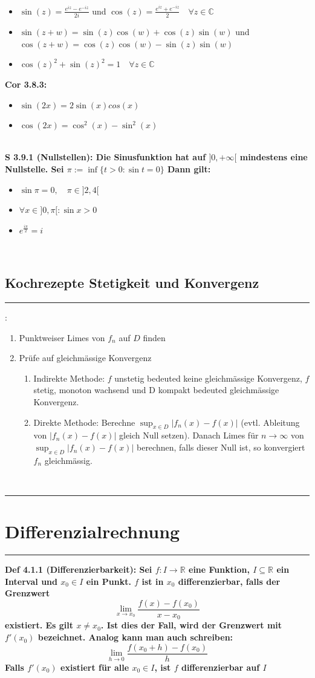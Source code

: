\documentclass[7pt,landscape, margin = 0.1mm]{article}
\newcommand{\titellinie}{\rule{1.\linewidth}{0.75pt}}
\newcommand*{\mysection}[2][black]{\vskip 0pt \titellinie\vspace{-20pt}\section{#2}\vspace{-14pt}\titellinie \colorlet{chaptecolor}{#1}}
\newcommand*{\mysubsection}[1]{\vspace{-2mm}\color{chaptercolor}\subsection{ #1 }
\vspace{-1mm}\hrule\vspace{1.5mm}\color{black}
\vspace{2mm}}
\newcommand{\KRZ}[2]{\vspace{1mm} \hline \vspace{1mm} \color{chaptercolor}{RC #1}:\color{black} \   \hspace{0.2cm}\vspace{1mm}   {\begin{minipage}{20em}
#2 \end{minipage}} \vspace{1mm}  \hline \vspace{1mm}  \\}
\newcommand{\DEF}[2]{\color{chaptercolor}\bf{Def #1}:\color{black}    \hspace{0.2cm} #2 \\}
\newcommand{\COR}[2]{\color{chaptercolor}\bf{Cor #1}:\color{black}    \hspace{0.2cm} #2 \\}
\newcommand{\SA}[2]{\color{chaptercolor}\bf{S #1}:\color{black}    \hspace{0.2cm} #2 \\}
\begin{document}
\begin{multicols}{4}
\begin{flushleft}
{\begin{itemize}
\item[3.] $\sin(z) = \frac{e^{iz}-e^{-i z}}{2i}$ und $\cos(z) = \frac{e^{iz}+e^{-i z}}{2} \quad \forall z \in \mathbb{C}$
\item[4.] $\sin(z+w) = \sin(z)\cos(w)+ \cos(z)\sin(w)$ und  $\cos(z+w) = \cos(z)\cos(w) - \sin(z)\sin(w)$
\item[5.] $\cos(z)^2+\sin(z)^2=1 \quad \forall z \in \mathbb{C}$
\end{itemize}}
\COR{3.8.3}{
\begin{itemize}
\item[1.] $ \sin(2x) = 2\sin(x)cos(x) $
\item[2.] $ \cos(2x) = \cos^2(x)- \sin^2(x) $
\end{itemize}
}
\SA{3.9.1 (Nullstellen)}{Die Sinusfunktion hat auf $] 0,+\infty[$ mindestens eine Nullstelle. Sei
$ \pi:=\inf \{t>0: \sin t=0\} $
Dann gilt:
\begin{itemize}
\item[1.] $\sin \pi=0, \quad \pi \in] 2,4[$
\item[2.] $\forall x \in] 0, \pi[: \sin x>0$
\item[3.] $e^{\frac{i \pi}{2}}=i$
\end{itemize}
 }
 
\mysubsection{Kochrezepte Stetigkeit und Konvergenz}
\KRZ{Konvergenz von Funktionenfolgen}{
\begin{enumerate}
\item Punktweiser Limes von $f_n$ auf $D$ finden
\item Prüfe auf gleichmässige Konvergenz
\begin{enumerate}
\item Indirekte Methode: $f$ unstetig bedeuted keine
gleichmässige Konvergenz, $f$ stetig, monoton wachsend und
D kompakt bedeuted gleichmässige Konvergenz.
\item Direkte Methode: Berechne $\sup _{x \in D}\left|f_n(x)-f(x)\right|$ (evtl. Ableitung von $\left|f_n(x)-f(x)\right|$ gleich Null setzen). Danach Limes für $n \rightarrow \infty$ von $\sup _{x \in D}\left|f_n(x)-f(x)\right|$ berechnen, falls dieser Null ist, so konvergiert $f_n$ gleichmässig.
\end{enumerate}
\end{enumerate}
}

\mysection[orange]{\centering Differenzialrechnung}
\DEF{4.1.1 (Differenzierbarkeit)}{Sei $f: I \to \mathbb{R}$ eine Funktion, $I \subseteq \mathbb{R}$ ein Interval und $x_0 \in I$ ein Punkt.
$f$ ist in $x_0$ differenzierbar, falls der Grenzwert
$$ \lim_{x\to x_0}\frac{f(x)-f(x_0)}{x-x_0} $$
existiert. Es gilt $x \neq x_0$. Ist dies der Fall, wird der Grenzwert mit $f'(x_0)$ bezeichnet. Analog kann man auch schreiben:
$$ \lim_{h\to 0}\frac{f(x_0+h)-f(x_0)}{h} $$
Falls $f'(x_0)$ existiert für alle $x_0 \in I$, ist $f$ differenzierbar auf $I$}


\end{flushleft}
\end{multicols}
\end{document}

